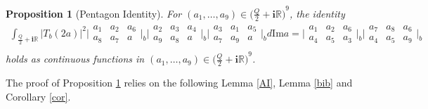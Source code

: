 \documentclass[11pt]{article}
\newtheorem{proposition}[theorem]{Proposition}
\theoremstyle{remark}
\theoremstyle{remark}
\numberwithin{equation}{section}
\begin{document}
 \begin{proposition}[Pentagon Identity]\label{32}
For $(a_1,\dots,a_9)\in{\big(\frac{Q}{2}+\mathbf{i}\mathbb R\big)}^{9}$, the identity
\begin{equation}\label{pentagon}
  \begin{split}
\int_{ \frac{Q}{2}+\mathbf{i}\mathbb R}|T_b(2a)|^2\bigg|\begin{matrix} 
    a_1 & a_2 & a_6\\
      a_8 & a_7 & a 
   \end{matrix}\bigg|_b
   \bigg|\begin{matrix} 
    a_2 & a_3 & a_4\\
      a_9 & a_8 & a 
   \end{matrix}\bigg|_b
   \bigg|\begin{matrix} 
    a_3 & a_1 & a_5\\
      a_7 & a_9 & a 
   \end{matrix}\bigg|_b
   d\mathrm{Im}a=\bigg|\begin{matrix} 
    a_1 & a_2 & a_6\\
      a_4 & a_5 & a_3 
   \end{matrix}\bigg|_b
   \bigg|\begin{matrix} 
   a_7 & a_8 & a_6\\
      a_4 & a_5 & a_9 
   \end{matrix}\bigg|_b\\
   \end{split}
    \end{equation}
   holds as  continuous functions in $(a_1,\dots,a_9)\in {\big(\frac{Q}{2}+\mathbf{i}\mathbb R\big)}^9$.
\end{proposition}

The proof of Proposition \ref{32} relies on the following Lemma \ref{AI}, Lemma \ref{bib} and Corollary \ref{cor}.
\end{document}
